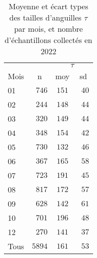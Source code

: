 \begin{table}[htbp]
\begin{center}
\begin{tabular}{lccc}
\hline
 &  & \multicolumn{2}{c}{$\tau$} \\ 
Mois  & n & moy & \multicolumn{1}{c}{sd} \\ 
\hline
01  & $\phantom{0}746$ & $151$ & $\phantom{0}40$ \\
02  & $\phantom{0}244$ & $148$ & $\phantom{0}44$ \\
03  & $\phantom{0}320$ & $149$ & $\phantom{0}44$ \\
04  & $\phantom{0}348$ & $154$ & $\phantom{0}42$ \\
05  & $\phantom{0}730$ & $132$ & $\phantom{0}46$ \\
06  & $\phantom{0}367$ & $165$ & $\phantom{0}58$ \\
07  & $\phantom{0}723$ & $191$ & $\phantom{0}45$ \\
08  & $\phantom{0}817$ & $172$ & $\phantom{0}57$ \\
09  & $\phantom{0}628$ & $142$ & $\phantom{0}61$ \\
10  & $\phantom{0}701$ & $196$ & $\phantom{0}48$ \\
12  & $\phantom{0}270$ & $141$ & $\phantom{0}37$ \\
Tous  & $5894$ & $161$ & $\phantom{0}53$ \\
\hline 
\end{tabular}
\label{summary_taille_yellow}
\caption{Moyenne et écart types des tailles d'anguilles $\tau$ par mois, et nombre d'échantillons collectés en 2022}
\end{center}
\end{table}
